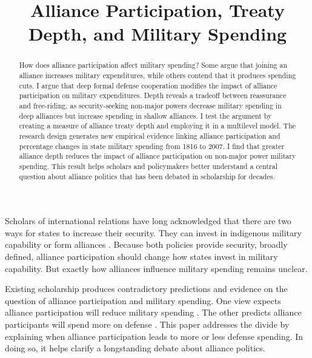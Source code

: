 \documentclass[12pt]{article}
\title{\textbf{Alliance Participation, Treaty Depth, and Military Spending}}
\date{}
\begin{document}
\maketitle 

\doublespace 

\begin{abstract}
How does alliance participation affect military spending? 
Some argue that joining an alliance increases military expenditures, while others contend that it produces spending cuts.
I argue that deep formal defense cooperation modifies the impact of alliance participation on military expenditures.  
Depth reveals a tradeoff between reassurance and free-riding, as security-seeking non-major powers decrease military spending in deep alliances but increase spending in shallow alliances.   
I test the argument by creating a measure of alliance treaty depth and employing it in a multilevel model. 
The research design generates new empirical evidence linking alliance participation and percentage changes in state military spending from 1816 to 2007. 
I find that greater alliance depth reduces the impact of alliance participation on non-major power military spending.  
This result helps scholars and policymakers better understand a central question about alliance politics that has been debated in scholarship for decades. 
\end{abstract}


\newpage 




Scholars of international relations have long acknowledged that there are two ways for states to increase their security. 
They can invest in indigenous military capability or form alliances \citep{Morgenthau1948, Altfield1984, Morrow1993}.
Because both policies provide security, broadly defined, alliance participation should change how states invest in military capability. 
But exactly how alliances influence military spending remains unclear. 


Existing scholarship produces contradictory predictions and evidence on the question of alliance participation and military spending. 
One view expects alliance participation will reduce military spending \citep{Morrow1993, Conybeare1994}. 
The other predicts alliance participants will spend more on defense \citep{Diehl1994, MorganPalmer2006}.
This paper addresses the divide by explaining when alliance participation leads to more or less defense spending. 
In doing so, it helps clarify a longstanding debate about alliance politics.
\end{document}
